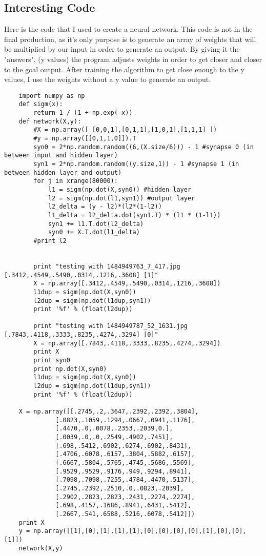 \documentclass[onecolumn, draftclsnofoot,10pt, compsoc]{IEEEtran}
\begin{document}
\begin{singlespace}
	\section{Interesting Code}
	Here is the code that I used to create a neural network.
	This code is not in the final production, as it's only purpose is to generate an array of weights that will be multiplied by our input in order to generate an output.
	By giving it the "answers", (y values) the program adjusts weights in order to get closer and closer to the goal output. 
	After training the algorithm to get close enough to the y values, I use the weights without a y value to generate an output.
	\begin{lstlisting}
	import numpy as np
	def sigm(x):
		return 1 / (1 + np.exp(-x))
	def network(X,y):	
		#X = np.array([ [0,0,1],[0,1,1],[1,0,1],[1,1,1] ])
		#y = np.array([[0,1,1,0]]).T
		syn0 = 2*np.random.random((6,(X.size/6))) - 1 #synapse 0 (in between input and hidden layer)	
		syn1 = 2*np.random.random((y.size,1)) - 1 #synapse 1 (in between hidden layer and output)
		for j in xrange(80000):
			l1 = sigm(np.dot(X,syn0)) #hidden layer
			l2 = sigm(np.dot(l1,syn1)) #output layer
			l2_delta = (y - l2)*(l2*(1-l2))
			l1_delta = l2_delta.dot(syn1.T) * (l1 * (1-l1))
			syn1 += l1.T.dot(l2_delta)
			syn0 += X.T.dot(l1_delta)
		#print l2
		

		print "testing with 1484949763_7_417.jpg [.3412,.4549,.5490,.0314,.1216,.3608] [1]"
		X = np.array([.3412,.4549,.5490,.0314,.1216,.3608])
		l1dup = sigm(np.dot(X,syn0))
		l2dup = sigm(np.dot(l1dup,syn1))
		print '%f' % (float(l2dup))

		print "testing with 1484949787_52_1631.jpg [.7843,.4118,.3333,.8235,.4274,.3294] [0]"
		X = np.array([.7843,.4118,.3333,.8235,.4274,.3294])
		print X
		print syn0
		print np.dot(X,syn0)
		l1dup = sigm(np.dot(X,syn0))
		l2dup = sigm(np.dot(l1dup,syn1))
		print '%f' % (float(l2dup))

	X = np.array([[.2745,.2,.3647,.2392,.2392,.3804],
			  [.0823,.1059,.1294,.0667,.0941,.1176],
			  [.4470,.0,.0078,.2353,.2039,0.],
			  [.0039,.0,.0,.2549,.4902,.7451],
			  [.698,.5412,.6902,.6274,.6902,.8431],
			  [.4706,.6078,.6157,.3804,.5882,.6157],
			  [.6667,.5804,.5765,.4745,.5686,.5569],
			  [.9529,.9529,.9176,.949,.9294,.8941],
			  [.7098,.7098,.7255,.4784,.4470,.5137],
			  [.2745,.2392,.2510,.0,.0823,.2039],
			  [.2902,.2823,.2823,.2431,.2274,.2274],
			  [.698,.4157,.1686,.8941,.6431,.5412],
			  [.2667,.541,.6588,.5216,.6078,.5412]])
	print X
	y = np.array([[1],[0],[1],[1],[1],[0],[0],[0],[0],[1],[0],[0],[1]])
	network(X,y)
	\end{lstlisting}
	

\end{singlespace}
\end{document}
